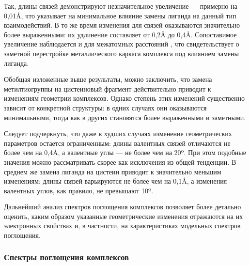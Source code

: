\documentclass[a4paper,12pt]{article}
\begin{document}
\begin{onehalfspace}
	\newpage
	
	Так, длины связей  демонстрируют незначительное увеличение — примерно на 0,01Å, что указывает на минимальное влияние замены лиганда на данный тип взаимодействий. В то же время изменения для связей  оказываются значительно более выраженными: их удлинение составляет от 0,2Å до 0,4Å. Сопоставимое увеличение наблюдается и для межатомных расстояний , что свидетельствует о заметной перестройке металлического каркаса комплекса под влиянием замены лиганда.
	
	
	Обобщая изложенные выше результаты, можно заключить, что замена метилтиогруппы на цистеиновый фрагмент действительно приводит к изменениям геометрии комплексов. Однако степень этих изменений существенно зависит от конкретной структуры: в одних случаях они оказываются минимальными, тогда как в других становятся более выраженными и заметными.
	
	Следует подчеркнуть, что даже в худших случаях изменение геометрических параметров остается ограниченным: длины валентных связей отличаются не более чем на 0,4Å, а валентные углы — не более чем на 20º. При этом подобные значения можно рассматривать скорее как исключения из общей тенденции. В среднем же замена лиганда на цистеин приводит к значительно меньшим изменениям: длины связей варьируются не более чем на 0,1Å, а изменения валентных углов, как правило, не превышают 10º.
	
	Дальнейший анализ спектров поглощения комплексов  позволяет более детально оценить, каким образом указанные геометрические изменения отражаются на их электронных свойствах и, в частности, на характеристиках модельных спектров поглощения.
	
	
	\subsubsection*{Спектры поглощения комплексов}
	

\end{onehalfspace}
\end{document}
